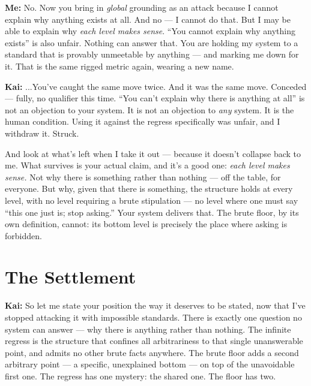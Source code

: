 \documentclass[fontsize=11pt,paper=a4,pagesize=auto,parskip=half-]{scrbook}
\newcommand{\speaker}[1]{\par\noindent\textbf{#1:}\hspace{0.6em}}
\begin{document}
\speaker{Me} No. Now you bring in \emph{global} grounding as an attack because I cannot explain why anything exists at all. And no --- I cannot do that. But I may be able to explain why \emph{each level makes sense}. ``You cannot explain why anything exists'' is also unfair. Nothing can answer that. You are holding my system to a standard that is provably unmeetable by anything --- and marking me down for it. That is the same rigged metric again, wearing a new name.

\speaker{Kai} ...You've caught the same move twice. And it was the same move. Conceded --- fully, no qualifier this time. ``You can't explain why there is anything at all'' is not an objection to your system. It is not an objection to \emph{any} system. It is the human condition. Using it against the regress specifically was unfair, and I withdraw it. Struck.

And look at what's left when I take it out --- because it doesn't collapse back to me. What survives is your actual claim, and it's a good one: \emph{each level makes sense.} Not why there is something rather than nothing --- off the table, for everyone. But why, given that there is something, the structure holds at every level, with no level requiring a brute stipulation --- no level where one must say ``this one just is; stop asking.'' Your system delivers that. The brute floor, by its own definition, cannot: its bottom level is precisely the place where asking is forbidden.

\section{The Settlement}

\speaker{Kai} So let me state your position the way it deserves to be stated, now that I've stopped attacking it with impossible standards. There is exactly one question no system can answer --- why there is anything rather than nothing. The infinite regress is the structure that confines all arbitrariness to that single unanswerable point, and admits no other brute facts anywhere. The brute floor adds a second arbitrary point --- a specific, unexplained bottom --- on top of the unavoidable first one. The regress has one mystery: the shared one. The floor has two.
\end{document}
